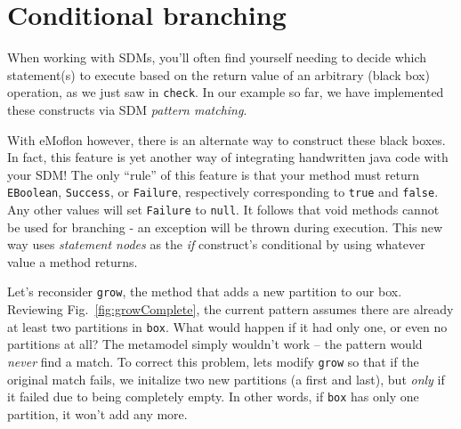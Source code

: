 \newpage
\hypertarget{sec:conBran}{}
\section{Conditional branching}
\genHeader

When working with SDMs, you'll often find yourself needing to decide which statement(s) to execute based on the return value of an arbitrary (black box)
operation, as we just saw in \texttt{check}. In our example so far, we have implemented these constructs via SDM \emph{pattern matching}. 

With eMoflon however, there is an alternate way to construct these black boxes. In fact, this feature is yet another way of integrating handwritten java code
with your SDM! The only ``rule'' of this feature is that your method must return \texttt{EBoolean}, \texttt{Success}, or \texttt{Failure}, respectively
corresponding to \texttt{true} and \texttt{false}. Any other values will set \texttt{Failure} to \texttt{null}. It follows that void methods cannot be used for
branching - an exception will be thrown during execution. This new way uses \emph{statement nodes} as the \emph{if} construct's conditional by using whatever
value a method returns.

Let's reconsider \texttt{grow}, the method that adds a new partition to our box. Reviewing Fig.~\ref{fig:growComplete}, the current pattern assumes
there are already at least two partitions in \texttt{box}. What would happen if it had only one, or even no partitions at all? The metamodel simply wouldn't
work -- the pattern would \emph{never} find a match. To correct this problem, lets modify \texttt{grow} so that if the original match fails, we
initalize two new partitions (a first and last), but \emph{only} if it failed due to being completely empty. In other words, if \texttt{box} has only one
partition, it won't add any more.





